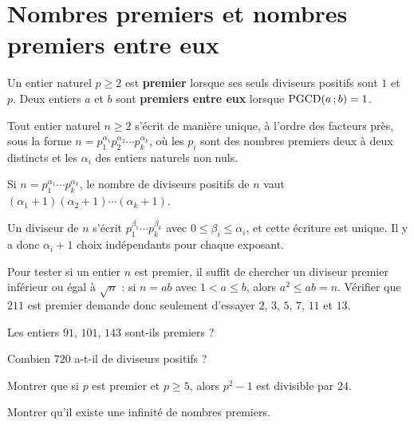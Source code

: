 \section{Nombres premiers et nombres premiers entre eux}

\begin{definition}
Un entier naturel $p \geq 2$ est \textbf{premier} lorsque ses seuls diviseurs
positifs sont $1$ et $p$. Deux entiers $a$ et $b$ sont \textbf{premiers entre
eux} lorsque $\operatorname{PGCD}(a\,;b) = 1$.
\end{definition}

\begin{theoreme}
Tout entier naturel $n \geq 2$ s'écrit de manière unique, à l'ordre des
facteurs près, sous la forme
$n = p_{1}^{\alpha_{1}}p_{2}^{\alpha_{2}}\cdots p_{k}^{\alpha_{k}}$, où les
$p_{i}$ sont des nombres premiers deux à deux distincts et les $\alpha_{i}$
des entiers naturels non nuls.
\end{theoreme}

\begin{propriete}
Si $n = p_{1}^{\alpha_{1}}\cdots p_{k}^{\alpha_{k}}$, le nombre de diviseurs
positifs de $n$ vaut $(\alpha_{1}+1)(\alpha_{2}+1)\cdots(\alpha_{k}+1)$.
\end{propriete}

\begin{demonstration}
Un diviseur de $n$ s'écrit $p_{1}^{\beta_{1}}\cdots p_{k}^{\beta_{k}}$ avec
$0 \leq \beta_{i} \leq \alpha_{i}$, et cette écriture est unique. Il y a donc
$\alpha_{i}+1$ choix indépendants pour chaque exposant.
\end{demonstration}

\begin{remarque}
Pour tester si un entier $n$ est premier, il suffit de chercher un diviseur
premier inférieur ou égal à $\sqrt n$ : si $n = ab$ avec $1<a\leq b$, alors
$a^{2} \leq ab = n$. Vérifier que $211$ est premier demande donc seulement
d'essayer $2$, $3$, $5$, $7$, $11$ et $13$.
\end{remarque}

\begin{entrainement}
\exo[\niveau{1}] Les entiers $91$, $101$, $143$ sont-ils premiers ?

\exo[\niveau{1}] Combien $720$ a-t-il de diviseurs positifs ?

\exo[\niveau{2}] Montrer que si $p$ est premier et $p \geq 5$, alors $p^{2}-1$
est divisible par $24$.

\exo[\niveau{3}] Montrer qu'il existe une infinité de nombres premiers.
\end{entrainement}

